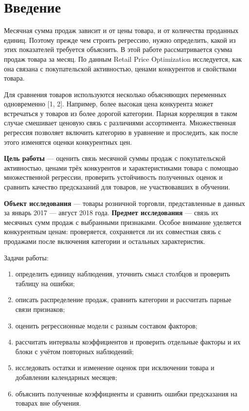 \documentclass[14pt,a4paper]{extreport}
\renewcommand{\contentsname}{СОДЕРЖАНИЕ}%
\begin{document}
\renewcommand{\contentsname}{СОДЕРЖАНИЕ}



\tableofcontents
\clearpage
\chapter*{Введение}

Месячная сумма продаж зависит и от цены товара, и от количества проданных единиц. Поэтому прежде чем строить регрессию, нужно определить, какой из этих показателей требуется объяснить. В этой работе рассматривается сумма продаж товара за месяц. По данным Retail Price Optimization исследуется, как она связана с покупательской активностью, ценами конкурентов и свойствами товара.

Для сравнения товаров используются несколько объясняющих переменных одновременно [1, 2]. Например, более высокая цена конкурента может встречаться у товаров из более дорогой категории. Парная корреляция в таком случае смешивает ценовую связь с различиями ассортимента. Множественная регрессия позволяет включить категорию в уравнение и проследить, как после этого изменятся оценки конкурентных цен.

\textbf{Цель работы} --- оценить связь месячной суммы продаж с покупательской активностью, ценами трёх конкурентов и характеристиками товара с помощью множественной регрессии, проверить устойчивость полученных оценок и сравнить качество предсказаний для товаров, не участвовавших в обучении.

\textbf{Объект исследования} --- товары розничной торговли, представленные в данных за январь 2017 --- август 2018 года. \textbf{Предмет исследования} --- связь их месячных сумм продаж с выбранными признаками. Особое внимание уделяется конкурентным ценам: проверяется, сохраняется ли их совместная связь с продажами после включения категории и остальных характеристик.

Задачи работы:
\begin{enumerate}
\item определить единицу наблюдения, уточнить смысл столбцов и проверить таблицу на ошибки;
\item описать распределение продаж, сравнить категории и рассчитать парные связи признаков;
\item оценить регрессионные модели с разным составом факторов;
\item рассчитать интервалы коэффициентов и проверить отдельные факторы и их блоки с учётом повторных наблюдений;
\item исследовать остатки и изменение оценок при исключении товара и добавлении календарных месяцев;
\item объяснить полученные коэффициенты и сравнить ошибки предсказания на товарах вне обучения.
\end{enumerate}
\end{document}
